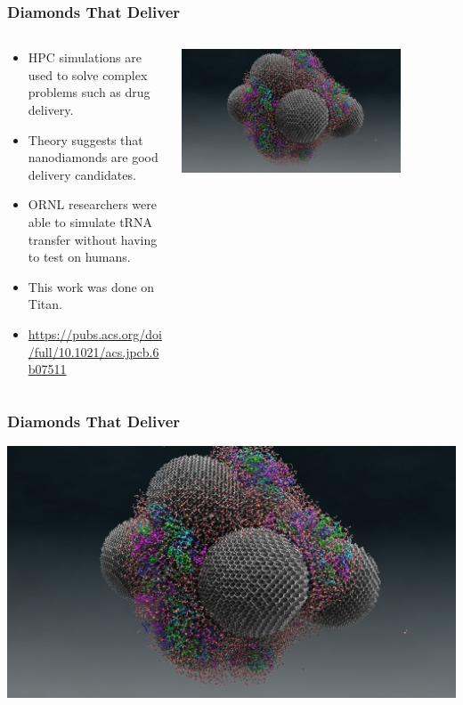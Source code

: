 \begin{frame}
\frametitle{Diamonds That Deliver}
\begin{columns}
    \begin{column}{0.5\paperwidth}
    \begin{itemize}
        \item HPC simulations are used to solve complex problems such as drug
        delivery.
        \item Theory suggests that nanodiamonds are good delivery candidates.
        \item ORNL researchers were able to simulate tRNA transfer without
        having to test on humans.
        \item This work was done on Titan.
        \item
        \href{https://pubs.acs.org/doi/full/10.1021/acs.jpcb.6b07511}{https://pubs.acs.org/doi/full/10.1021/acs.jpcb.6b07511}
    \end{itemize}
    \end{column}
    \begin{column}{0.5\paperwidth}
        \center\includegraphics[width=0.8\textwidth]{NanoDiamond.png}
    \end{column}
\end{columns}
\end{frame}

\begin{frame}
\frametitle{Diamonds That Deliver}
\center\includegraphics[width=\textwidth]{NanoDiamond.png}
\end{frame}

